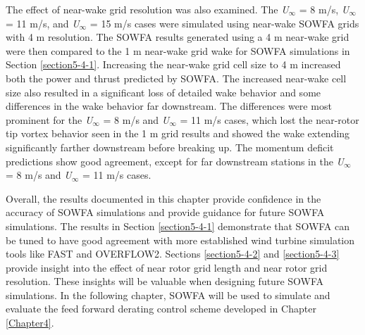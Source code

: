 The effect of near-wake grid resolution was also examined. The \emph{U$_\infty$} = 8 m/s, \emph{U$_\infty$} = 11 m/s, and \emph{U$_\infty$} = 15 m/s cases were simulated using near-wake SOWFA grids with 4 m resolution. The SOWFA results generated using a 4 m near-wake grid were then compared to the 1 m near-wake grid wake for SOWFA simulations in Section \ref{section5-4-1}. Increasing the near-wake grid cell size to 4 m increased both the power and thrust predicted by SOWFA. The increased near-wake cell size also resulted in a significant loss of detailed wake behavior and some differences in the wake behavior far downstream. The differences were most prominent for the \emph{U$_\infty$} = 8 m/s and \emph{U$_\infty$} = 11 m/s cases, which lost the near-rotor tip vortex behavior seen in the 1 m grid results and showed the wake extending significantly farther downstream before breaking up. The momentum deficit predictions show good agreement, except for far downstream stations in the \emph{U$_\infty$} = 8 m/s and \emph{U$_\infty$} = 11 m/s cases.

Overall, the results documented in this chapter provide confidence in the accuracy of SOWFA simulations and provide guidance for future SOWFA simulations. The results in Section \ref{section5-4-1} demonstrate that SOWFA can be tuned to have good agreement with more established wind turbine simulation tools like FAST and OVERFLOW2. Sections \ref{section5-4-2} and \ref{section5-4-3} provide insight into the effect of near rotor grid length and near rotor grid resolution. These insights will be valuable when designing future SOWFA simulations. In the following chapter, SOWFA will be used to simulate and evaluate the feed forward derating control scheme developed in Chapter \ref{Chapter4}. 